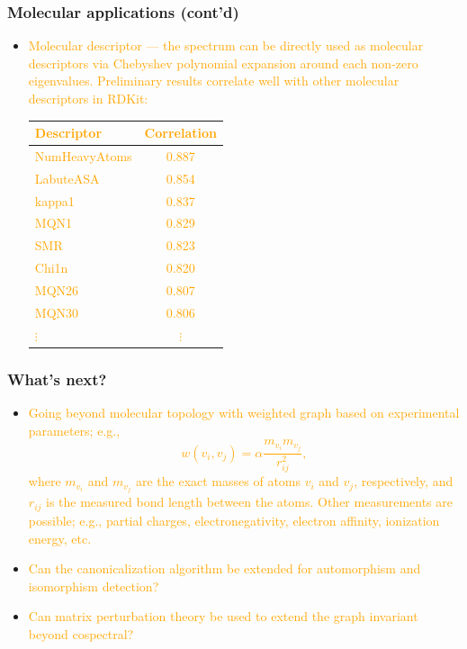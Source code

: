 \documentclass{beamer}
\begin{document}
\begin{frame}
  \frametitle{Molecular applications (cont'd)}
  \begin{itemize}
    \item \textcolor{orange}{Molecular descriptor --- the spectrum can
      be directly used as molecular descriptors via Chebyshev
      polynomial expansion around each non-zero
      eigenvalues. Preliminary results correlate well with other
      molecular descriptors in RDKit:
      \begin{tabular}{lc}\\ \toprule
        Descriptor & Correlation\\ \midrule
        NumHeavyAtoms &	0.887\\
        LabuteASA	&0.854\\
        kappa1 &	0.837\\
        MQN1 &	0.829\\
        SMR &	0.823\\
        Chi1n&	0.820\\
        MQN26&	0.807\\
        MQN30&	0.806\\
        $\vdots$ & $\vdots$\\ \bottomrule
      \end{tabular}
    }
  \end{itemize}
\end{frame}

\begin{frame}
  \frametitle{What's next?}
  \begin{itemize}
    \item \textcolor{orange}{Going beyond molecular topology with
      weighted graph based on experimental parameters; e.g.,
      \[ w(v_i,v_j) = \alpha\frac{m_{v_i}m_{v_j}}{r_{ij}^2},\]
      where $m_{v_i}$ and $m_{v_j}$ are the exact masses of atoms $v_i$
      and $v_j$, respectively, and $r_{ij}$ is the measured bond
      length between the atoms. Other measurements are possible; e.g.,
      partial charges, electronegativity, electron affinity,
      ionization energy, etc.}
    \item\textcolor{orange}{Can the canonicalization algorithm be extended for
      automorphism and isomorphism detection?}
    \item\textcolor{orange}{Can matrix perturbation theory be used to
      extend the graph invariant beyond cospectral?}
  \end{itemize}
\end{frame}
\end{document}

